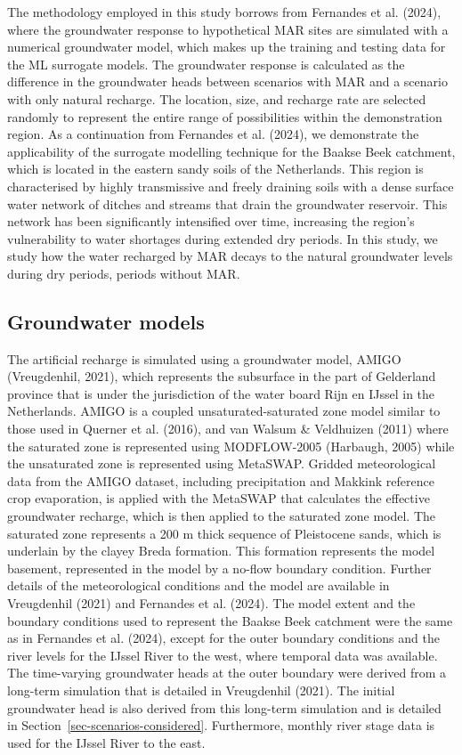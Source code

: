 \documentclass[
]{agujournal2019}
\begin{document}
The methodology employed in this study borrows from Fernandes et al.
(2024), where the groundwater response to hypothetical MAR sites are
simulated with a numerical groundwater model, which makes up the
training and testing data for the ML surrogate models. The groundwater
response is calculated as the difference in the groundwater heads
between scenarios with MAR and a scenario with only natural recharge.
The location, size, and recharge rate are selected randomly to represent
the entire range of possibilities within the demonstration region. As a
continuation from Fernandes et al. (2024), we demonstrate the
applicability of the surrogate modelling technique for the Baakse Beek
catchment, which is located in the eastern sandy soils of the
Netherlands. This region is characterised by highly transmissive and
freely draining soils with a dense surface water network of ditches and
streams that drain the groundwater reservoir. This network has been
significantly intensified over time, increasing the region's
vulnerability to water shortages during extended dry periods. In this
study, we study how the water recharged by MAR decays to the natural
groundwater levels during dry periods, periods without MAR.

\subsection{Groundwater models}\label{groundwater-models}

The artificial recharge is simulated using a groundwater model, AMIGO
(Vreugdenhil, 2021), which represents the subsurface in the part of
Gelderland province that is under the jurisdiction of the water board
Rijn en IJssel in the Netherlands. AMIGO is a coupled
unsaturated-saturated zone model similar to those used in Querner et al.
(2016), and van Walsum \& Veldhuizen (2011) where the saturated zone is
represented using MODFLOW-2005 (Harbaugh, 2005) while the unsaturated
zone is represented using MetaSWAP. Gridded meteorological data from the
AMIGO dataset, including precipitation and Makkink reference crop
evaporation, is applied with the MetaSWAP that calculates the effective
groundwater recharge, which is then applied to the saturated zone model.
The saturated zone represents a 200 m thick sequence of Pleistocene
sands, which is underlain by the clayey Breda formation. This formation
represents the model basement, represented in the model by a no-flow
boundary condition. Further details of the meteorological conditions and
the model are available in Vreugdenhil (2021) and Fernandes et al.
(2024). The model extent and the boundary conditions used to represent
the Baakse Beek catchment were the same as in Fernandes et al. (2024),
except for the outer boundary conditions and the river levels for the
IJssel River to the west, where temporal data was available. The
time-varying groundwater heads at the outer boundary were derived from a
long-term simulation that is detailed in Vreugdenhil (2021). The initial
groundwater head is also derived from this long-term simulation and is
detailed in Section~\ref{sec-scenarios-considered}. Furthermore, monthly
river stage data is used for the IJssel River to the east.
\end{document}
